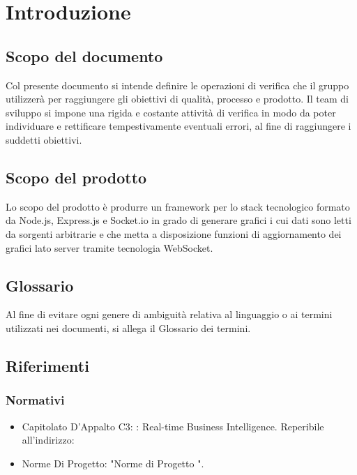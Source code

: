 
\section{Introduzione}
	\subsection{Scopo del documento}
		Col presente documento si intende definire le operazioni di verifica che il gruppo \groupname utilizzerà per raggiungere gli obiettivi di qualità, processo e prodotto. Il team di sviluppo si impone una rigida e costante attività di verifica in modo da poter individuare e rettificare tempestivamente eventuali errori, al fine di raggiungere i suddetti obiettivi. 
	\subsection{Scopo del prodotto}
		Lo scopo del prodotto è produrre un framework per lo stack tecnologico formato da Node.js, Express.js e Socket.io in grado di generare grafici i cui dati sono letti da sorgenti arbitrarie e che metta a disposizione funzioni di aggiornamento dei grafici lato server tramite tecnologia WebSocket.
	\subsection{Glossario}
		Al fine di evitare ogni genere di ambiguità relativa al linguaggio o ai termini utilizzati nei documenti, si allega il Glossario dei termini.
	\subsection{Riferimenti}
		\subsubsection{Normativi}
			\begin{itemize}
				\item Capitolato D'Appalto C3: \projectname: Real-time Business Intelligence. Reperibile all'indirizzo: 
				\item Norme Di Progetto: "Norme di Progetto \lastversion".
			\end{itemize}
